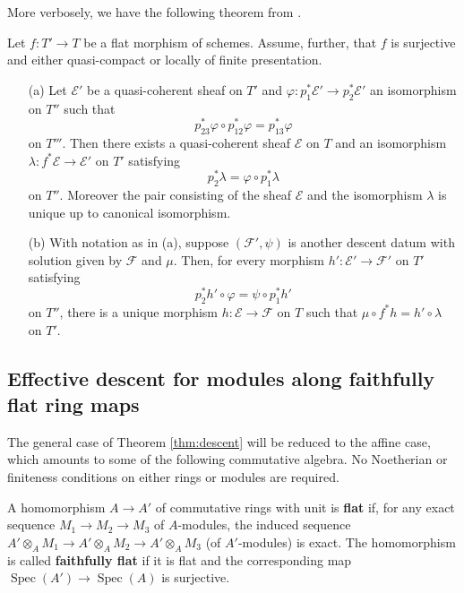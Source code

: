 \documentclass[12pt]{article}
\begin{document}
More verbosely, we have the following theorem from \cite{descent}.
\begin{theorem}\label{thm:descent}
    Let $f: T' \to T$ be a flat morphism of schemes. Assume, further, that $f$ is surjective and either quasi-compact or locally of finite presentation.

    \begin{enumerate}
        \item[(a)] Let $\mathcal{E}'$ be a quasi-coherent sheaf on $T'$ and $\varphi: p_1^*\mathcal{E}' \to p_2^*\mathcal{E}'$ an isomorphism on $T''$ such that
              \[
                  p_{23}^*\varphi \circ p_{12}^*\varphi = p_{13}^*\varphi
              \]
              on $T'''$. Then there exists a quasi-coherent sheaf $\mathcal{E}$ on $T$ and an isomorphism $\lambda: f^*\mathcal{E} \to \mathcal{E}'$ on $T'$ satisfying
              \[
                  p_2^*\lambda = \varphi \circ p_1^*\lambda
              \]
              on $T''$. Moreover the pair consisting of the sheaf $\mathcal{E}$ and the isomorphism $\lambda$ is unique up to canonical isomorphism.

        \item[(b)] With notation as in (a), suppose $(\mathcal{F}', \psi)$ is another descent datum with solution given by $\mathcal{F}$ and $\mu$. Then, for every morphism $h': \mathcal{E}' \to \mathcal{F}'$ on $T'$ satisfying
              \[
                  p_2^*h' \circ \varphi = \psi \circ p_1^*h'
              \]
              on $T''$, there is a unique morphism $h: \mathcal{E} \to \mathcal{F}$ on $T$ such that $\mu \circ f^*h = h' \circ \lambda$ on $T'$.
    \end{enumerate}
\end{theorem}


\subsection{Effective descent for modules along faithfully flat ring maps}
The general case of Theorem \ref{thm:descent} will be reduced to the affine case, which amounts to some of the following commutative algebra. No Noetherian or finiteness conditions on either rings or modules are required.

\begin{definition}
    A homomorphism $A \to A'$ of commutative rings with unit is \textbf{flat} if, for any exact sequence $M_1 \to M_2 \to M_3$ of $A$-modules, the induced sequence $A' \otimes_A M_1 \to A' \otimes_A M_2 \to A' \otimes_A M_3$ (of $A'$-modules) is exact. The homomorphism is called \textbf{faithfully flat} if it is flat and the corresponding map $\operatorname{Spec}(A') \to \operatorname{Spec}(A)$ is surjective.
\end{definition}
\end{document}
